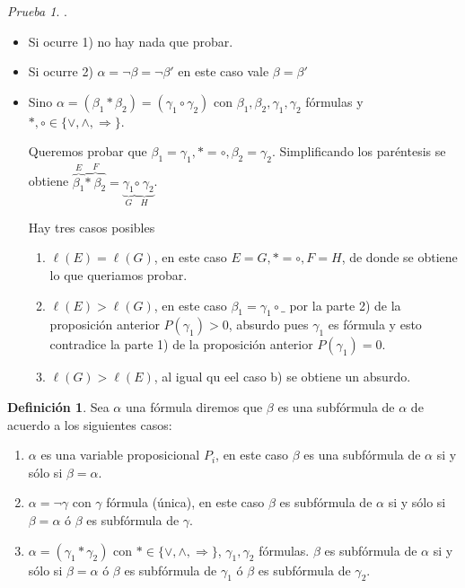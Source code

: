 \documentclass[a4paper,11pt]{article}
\theoremstyle{definition}
\newtheorem{defn}{Definición}[section]
\theoremstyle{remark}
\newtheorem*{prue}{Prueba}
\begin{document}
\begin{prue}.
\begin{itemize}
\item Si ocurre 1) no hay nada que probar.
\item Si ocurre 2) $\alpha = \neg \beta = \neg \beta'$ en este caso vale $\beta = \beta'$
\item Sino $\alpha = (\beta_1 * \beta_2) = (\gamma_1 \circ \gamma_2)$ con 
$\beta_1, \beta_2, \gamma_1, \gamma_2$ fórmulas y $*,\circ \in \{\vee, \wedge, \Rightarrow\}$.

Queremos probar que $\beta_1 = \gamma_1, * = \circ, \beta_2 = \gamma_2$. Simplificando
los paréntesis se obtiene $\overbrace{\beta_1}^{E} \overbrace{*\  \beta_2}^{F} = 
\underbrace{\gamma_1}_{G}\underbrace{\circ\ \gamma_2}_{H}$.

Hay tres casos posibles

\begin{enumerate}[label=\alph*)]
\item $\ell(E) = \ell(G)$, en este caso $E = G, * = \circ, F = H$, de donde se obtiene
lo que queriamos probar.
\item $\ell(E) > \ell(G)$, en este caso $\beta_1 = \gamma_1 \circ \_$ por la parte 2)
de la proposición anterior $P(\gamma_1) > 0$, absurdo pues $\gamma_1$ es fórmula y
esto contradice la parte 1) de la proposición anterior $P(\gamma_1) = 0$.
\item $\ell(G) > \ell(E)$, al igual qu eel caso b) se obtiene un absurdo.
\end{enumerate}
\end{itemize}
\end{prue}

\begin{defn}
Sea $\alpha$ una fórmula diremos que $\beta$ es una subfórmula de $\alpha$ de acuerdo
a los siguientes casos:
\begin{enumerate}
\item $\alpha$ es una variable proposicional $P_i$, en este caso $\beta$ es una subfórmula
de $\alpha$ si y sólo si $\beta = \alpha$.
\item $\alpha = \neg\gamma$ con $\gamma$ fórmula (única), en este caso $\beta$ es subfórmula
de $\alpha$ si y sólo si $\beta = \alpha$ ó $\beta$ es subfórmula de $\gamma$.
\item $\alpha = (\gamma_1 * \gamma_2)$ con $* \in \{\vee, \wedge, \Rightarrow\}$, 
$\gamma_1, \gamma_2$ fórmulas. $\beta$ es subfórmula de $\alpha$ si y sólo si 
$\beta = \alpha$ ó $\beta$ es subfórmula de $\gamma_1$ ó $\beta$ es subfórmula
de $\gamma_2$.
\end{enumerate}
\end{defn}
\end{document}
